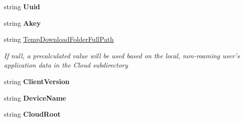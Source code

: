 \begin{DoxyCompactItemize}
\item 
\hypertarget{class_file_monitor_1_1_sync_settings_1_1_sync_settings_aab7a67d952dbc1260477d404b02eb9b4}{string {\bfseries Uuid}}\label{class_file_monitor_1_1_sync_settings_1_1_sync_settings_aab7a67d952dbc1260477d404b02eb9b4}

\item 
\hypertarget{class_file_monitor_1_1_sync_settings_1_1_sync_settings_ab46548521fb5b37d532e85e7d10b60e0}{string {\bfseries Akey}}\label{class_file_monitor_1_1_sync_settings_1_1_sync_settings_ab46548521fb5b37d532e85e7d10b60e0}

\item 
string \hyperlink{class_file_monitor_1_1_sync_settings_1_1_sync_settings_afb2c404cad169eb94c32465e37345540}{Temp\-Download\-Folder\-Full\-Path}
\begin{DoxyCompactList}\small\item\em If null, a precalculated value will be used based on the local, non-\/roaming user's application data in the Cloud subdirectory \end{DoxyCompactList}\item 
\hypertarget{class_file_monitor_1_1_sync_settings_1_1_sync_settings_a4ea003c89bc292d394a1d60ad7328c15}{string {\bfseries Client\-Version}}\label{class_file_monitor_1_1_sync_settings_1_1_sync_settings_a4ea003c89bc292d394a1d60ad7328c15}

\item 
\hypertarget{class_file_monitor_1_1_sync_settings_1_1_sync_settings_a6d252a55717cb91deb73312c49f92d72}{string {\bfseries Device\-Name}}\label{class_file_monitor_1_1_sync_settings_1_1_sync_settings_a6d252a55717cb91deb73312c49f92d72}

\item 
\hypertarget{class_file_monitor_1_1_sync_settings_1_1_sync_settings_a9aa92f95ef421bc495d460c8fec29c1f}{string {\bfseries Cloud\-Root}}\label{class_file_monitor_1_1_sync_settings_1_1_sync_settings_a9aa92f95ef421bc495d460c8fec29c1f}

\end{DoxyCompactItemize}


